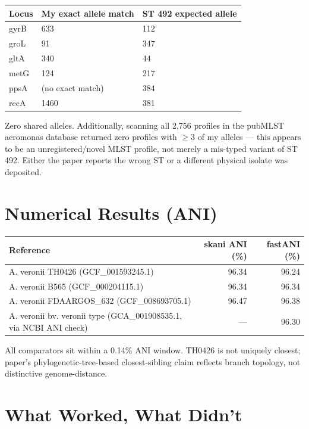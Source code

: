 \documentclass[10pt]{article}
\begin{document}
\begin{center}
\begin{tabular}{@{}lll@{}}
\toprule
Locus & My exact allele match & ST 492 expected allele \\
\midrule
gyrB & 633 & 112 \\
groL & 91  & 347 \\
gltA & 340 & 44  \\
metG & 124 & 217 \\
ppsA & (no exact match) & 384 \\
recA & 1460 & 381 \\
\bottomrule
\end{tabular}
\end{center}

Zero shared alleles. Additionally, scanning all 2{,}756 profiles in the pubMLST aeromonas database returned zero profiles with $\geq$3 of my alleles --- this appears to be an unregistered/novel MLST profile, not merely a mis-typed variant of ST 492. Either the paper reports the wrong ST or a different physical isolate was deposited.

\section{Numerical Results (ANI)}

\begin{center}
\begin{tabular}{@{}lrr@{}}
\toprule
Reference & skani ANI (\%) & fastANI (\%) \\
\midrule
A. veronii TH0426 (GCF\_001593245.1) & 96.34 & 96.24 \\
A. veronii B565 (GCF\_000204115.1) & 96.34 & 96.34 \\
A. veronii FDAARGOS\_632 (GCF\_008693705.1) & 96.47 & 96.38 \\
A. veronii bv. veronii type (GCA\_001908535.1, via NCBI ANI check) & --- & 96.30 \\
\bottomrule
\end{tabular}
\end{center}

All comparators sit within a 0.14\% ANI window. TH0426 is not uniquely closest; paper's phylogenetic-tree-based closest-sibling claim reflects branch topology, not distinctive genome-distance.

\section{What Worked, What Didn't}
\end{document}

